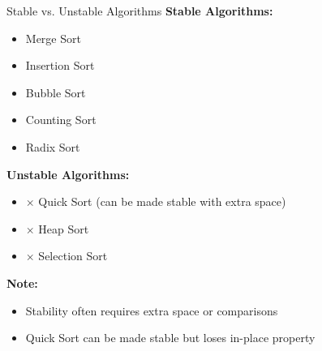 \documentclass[aspectratio=169]{beamer}
\begin{document}
\begin{frame}{Stable vs. Unstable Algorithms}
  \textbf{Stable Algorithms:}
  \begin{itemize}
    \item \checkmark Merge Sort
    \item \checkmark Insertion Sort
    \item \checkmark Bubble Sort
    \item \checkmark Counting Sort
    \item \checkmark Radix Sort
  \end{itemize}

  \vspace{0.3cm}
  \textbf{Unstable Algorithms:}
  \begin{itemize}
    \item $\times$ Quick Sort (can be made stable with extra space)
    \item $\times$ Heap Sort
    \item $\times$ Selection Sort
  \end{itemize}

  \vspace{0.3cm}
  \textbf{Note:}
  \begin{itemize}
    \item Stability often requires extra space or comparisons
    \item Quick Sort can be made stable but loses in-place property
  \end{itemize}
\end{frame}
\end{document}
